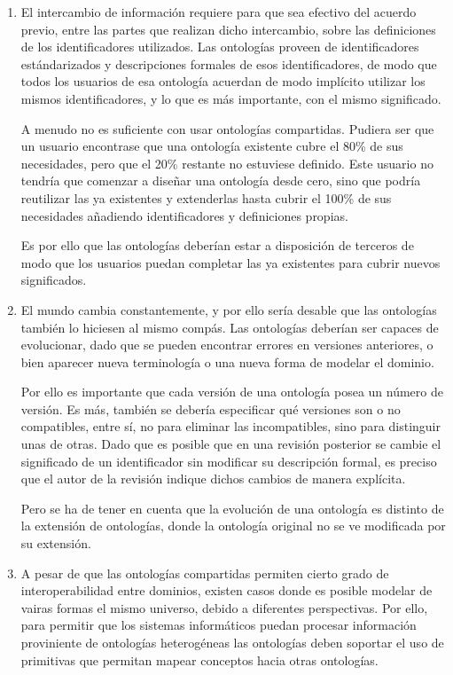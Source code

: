 		\begin {enumerate}
		
			\item El intercambio de información requiere para que sea efectivo del acuerdo previo, entre las partes que realizan dicho intercambio, sobre las definiciones de los identificadores utilizados. Las ontologías proveen de identificadores estándarizados y descripciones formales de esos identificadores, de modo que todos los usuarios de esa ontología acuerdan de modo implícito utilizar los mismos identificadores, y lo que es más importante, con el mismo significado. 
      	
			A menudo no es suficiente con usar ontologías compartidas. Pudiera ser que un usuario encontrase que una ontología existente cubre el 80\% de sus necesidades, pero que el 20\% restante no estuviese definido. Este usuario no tendría que comenzar a diseñar una ontología desde cero, sino que podría reutilizar las ya existentes y extenderlas hasta cubrir el 100\% de sus necesidades añadiendo identificadores y definiciones propias.
      	
      			Es por ello que las ontologías deberían estar a disposición de terceros de modo que los usuarios puedan completar las ya existentes para cubrir nuevos significados.
      	
      			\item El mundo cambia constantemente, y por ello sería desable que las ontologías también lo hiciesen al mismo compás. Las ontologías deberían ser capaces de evolucionar, dado que se pueden encontrar errores en versiones anteriores, o bien aparecer nueva terminología o una nueva forma de modelar el dominio. 
      	
      			Por ello es importante que cada versión de una ontología posea un número de versión. Es más, también se debería especificar qué versiones son o no compatibles, entre sí, no para eliminar las incompatibles, sino para distinguir unas de otras. Dado que es posible que en una revisión posterior se cambie el significado de un identificador sin modificar su descripción formal, es preciso que el autor de la revisión indique dichos cambios de manera explícita.
      	
      			Pero se ha de tener en cuenta que la evolución de una ontología es distinto de la extensión de ontologías, donde la ontología original no se ve modificada por su extensión.
      	
     			\item A pesar de que las ontologías compartidas permiten cierto grado de interoperabilidad entre dominios, existen casos donde es posible modelar de vairas formas el mismo universo, debido a diferentes perspectivas. Por ello, para permitir que los sistemas informáticos puedan procesar información proviniente de ontologías heterogéneas las ontologías deben soportar el uso de primitivas que permitan mapear conceptos hacia otras ontologías.
     	

\end{enumerate}
